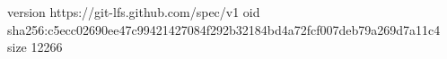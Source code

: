 version https://git-lfs.github.com/spec/v1
oid sha256:c5ecc02690ee47c99421427084f292b32184bd4a72fcf007deb79a269d7a11c4
size 12266
